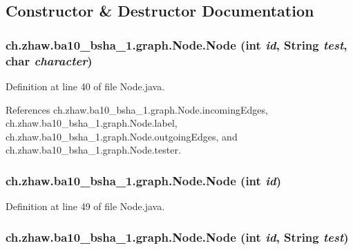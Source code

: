 \subsection{Constructor \& Destructor Documentation}
\hypertarget{classch_1_1zhaw_1_1ba10__bsha__1_1_1graph_1_1Node_ac83645efc3aceb760b465c38bd3d6083}{
\subsubsection[{Node}]{\setlength{\rightskip}{0pt plus 5cm}ch.zhaw.ba10\_\-bsha\_\-1.graph.Node.Node (int {\em id}, \/  String {\em test}, \/  char {\em character})}}
\label{classch_1_1zhaw_1_1ba10__bsha__1_1_1graph_1_1Node_ac83645efc3aceb760b465c38bd3d6083}


Definition at line 40 of file Node.java.

References ch.zhaw.ba10\_\-bsha\_\-1.graph.Node.incomingEdges, ch.zhaw.ba10\_\-bsha\_\-1.graph.Node.label, ch.zhaw.ba10\_\-bsha\_\-1.graph.Node.outgoingEdges, and ch.zhaw.ba10\_\-bsha\_\-1.graph.Node.tester.\hypertarget{classch_1_1zhaw_1_1ba10__bsha__1_1_1graph_1_1Node_afbca65b1cddca6b543f2227031529020}{
\subsubsection[{Node}]{\setlength{\rightskip}{0pt plus 5cm}ch.zhaw.ba10\_\-bsha\_\-1.graph.Node.Node (int {\em id})}}
\label{classch_1_1zhaw_1_1ba10__bsha__1_1_1graph_1_1Node_afbca65b1cddca6b543f2227031529020}


Definition at line 49 of file Node.java.\hypertarget{classch_1_1zhaw_1_1ba10__bsha__1_1_1graph_1_1Node_a7842c35883c45ad3b56fcdcfe830e738}{
\subsubsection[{Node}]{\setlength{\rightskip}{0pt plus 5cm}ch.zhaw.ba10\_\-bsha\_\-1.graph.Node.Node (int {\em id}, \/  String {\em test})}}
\label{classch_1_1zhaw_1_1ba10__bsha__1_1_1graph_1_1Node_a7842c35883c45ad3b56fcdcfe830e738}


